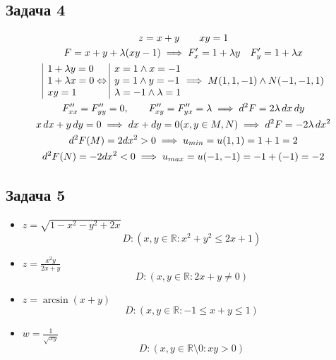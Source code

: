 \documentclass[a4paper,fleqn,12pt]{article}
\theoremstyle{definition}
\begin{document}
\subsection*{Задача 4}
\begin{gather*}
z = x + y \qquad xy = 1\\
F = x + y + \lambda(xy - 1) \implies F'_x = 1 + \lambda y \quad F'_y = 1 + \lambda x \\
\begin{array}{|l@{}}
1 + \lambda y = 0\\
1 + \lambda x = 0 \\
xy = 1
\end{array}\Leftrightarrow 
\begin{array}{|l@{}}
x = 1 \land x = -1\\
y = 1 \land y = -1\\
\lambda = -1 \land \lambda = 1
\end{array} \implies M(1,1,-1) \land N(-1,-1,1) \\
F''_{xx} = F''_{yy} = 0 ,\qquad F''_{xy} = F''_{yx} = \lambda \implies d^2 F = 2\lambda \, dx \, dy \\
x \, dx + y \, dy = 0 \implies dx+dy =0 (x,y \in M, N)  \implies d^2 F = -2 \lambda \, dx^2\\
d^2 F(M) = 2 dx^2 > 0 \implies u_{min} = u(1,1) = 1+1 = 2 \\ 
d^2 F(N) = -2 dx^2 < 0 \implies u_{max} = u(-1,-1) = -1 + (-1) = -2 
\end{gather*}

\subsection*{Задача 5}
\begin{itemize}
\item $z = \sqrt{1 - x^2 - y^2 + 2x}$
$$D: (x, y \in \mathbb{R}: x^2 + y^2 \leq 2x + 1)$$
\item $z = \frac{x^2y}{2x+y}$
$$D: (x,y \in \mathbb{R}: 2x + y \neq 0)$$
\item $z = \arcsin{(x+y)}$
$$D: (x,y \in \mathbb{R}: -1 \leq x+y \leq 1)$$
\item $w = \frac{1}{\sqrt{xy}}$
$$D: (x,y \in \mathbb{R} \setminus 0: xy > 0)$$
\end{itemize}
\end{document}
